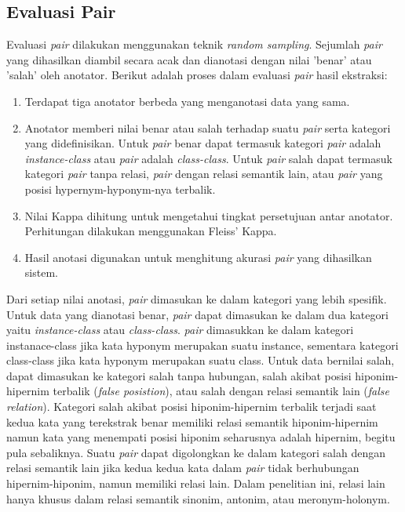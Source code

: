 \subsection{Evaluasi Pair}
Evaluasi \textit{pair} dilakukan menggunakan teknik \textit{random sampling}. Sejumlah \textit{pair} yang dihasilkan diambil secara acak dan dianotasi dengan nilai 'benar' atau 'salah' oleh anotator. Berikut adalah proses dalam evaluasi \textit{pair} hasil ekstraksi:
\begin{enumerate}
  \item Terdapat tiga anotator berbeda yang menganotasi data yang sama. 
  \item Anotator memberi nilai benar atau salah terhadap suatu \textit{pair} serta kategori yang didefinisikan. Untuk \textit{pair} benar dapat termasuk kategori \textit{pair} adalah \textit{instance-class} atau \textit{pair} adalah \textit{class-class}. Untuk \textit{pair} salah dapat termasuk kategori \textit{pair} tanpa relasi, \textit{pair} dengan relasi semantik lain, atau \textit{pair} yang posisi hypernym-hyponym-nya terbalik. 
  \item Nilai Kappa dihitung untuk mengetahui tingkat persetujuan antar anotator. Perhitungan dilakukan menggunakan Fleiss' Kappa.
  \item Hasil anotasi digunakan untuk menghitung akurasi \textit{pair} yang dihasilkan sistem.
\end{enumerate}

Dari setiap nilai anotasi, \textit{pair} dimasukan ke dalam kategori yang lebih spesifik. Untuk data yang dianotasi benar, \textit{pair} dapat dimasukan ke dalam dua kategori yaitu \textit{instance-class} atau \textit{class-class}. \textit{pair} dimasukkan ke dalam kategori instanace-class jika kata hyponym merupakan suatu instance, sementara kategori class-class jika kata hyponym merupakan suatu class. Untuk data bernilai salah, dapat dimasukan ke kategori salah tanpa hubungan, salah akibat posisi hiponim-hipernim terbalik (\textit{false posistion}), atau salah dengan relasi semantik lain (\textit{false relation}). Kategori salah akibat posisi hiponim-hipernim terbalik terjadi saat kedua kata yang terekstrak benar memiliki relasi semantik hiponim-hipernim namun kata yang menempati posisi hiponim seharusnya adalah hipernim, begitu pula sebaliknya. Suatu \textit{pair} dapat digolongkan ke dalam kategori salah dengan relasi semantik lain jika kedua kedua kata dalam \textit{pair} tidak berhubungan hipernim-hiponim, namun memiliki relasi lain. Dalam penelitian ini, relasi lain hanya khusus dalam relasi semantik sinonim, antonim, atau meronym-holonym.

